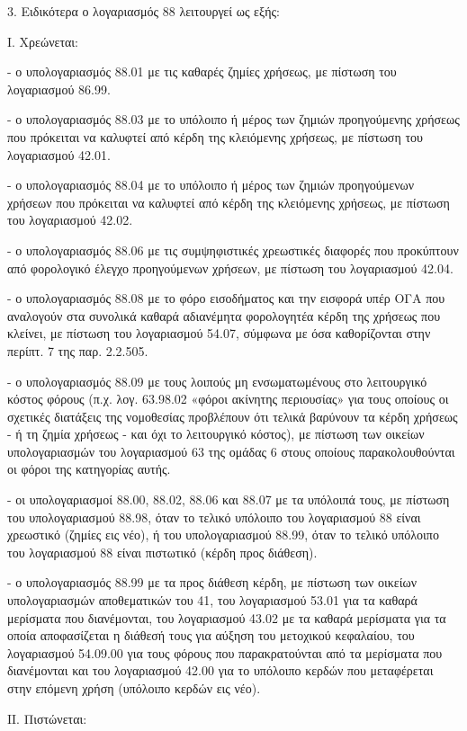 \documentclass[A4,10pt,greek]{book}
\begin{document}
3. Ειδικότερα ο λογαριασμός 88 λειτουργεί ως εξής:

Ι. Χρεώνεται:

- ο υπολογαριασμός 88.01 με τις καθαρές ζημίες χρήσεως, με πίστωση του λογαριασμού 86.99.

- ο υπολογαριασμός 88.03 με το υπόλοιπο ή μέρος των ζημιών προηγούμενης χρήσεως που πρόκειται να καλυφτεί από κέρδη της κλειόμενης χρήσεως, με πίστωση του λογαριασμού 42.01.

- ο υπολογαριασμός 88.04 με το υπόλοιπο ή μέρος των ζημιών προηγούμενων χρήσεων που πρόκειται να καλυφτεί από κέρδη της κλειόμενης χρήσεως, με πίστωση του λογαριασμού 42.02.

- ο υπολογαριασμός 88.06 με τις συμψηφιστικές χρεωστικές διαφορές που προκύπτουν από φορολογικό έλεγχο προηγούμενων χρήσεων, με πίστωση του λογαριασμού 42.04.

- ο υπολογαριασμός 88.08 με το φόρο εισοδήματος και την εισφορά υπέρ ΟΓΑ που αναλογούν στα συνολικά καθαρά αδιανέμητα φορολογητέα κέρδη της χρήσεως που κλείνει, με πίστωση του λογαριασμού 54.07, σύμφωνα με όσα καθορίζονται στην περίπτ. 7 της παρ. 2.2.505.

- ο υπολογαριασμός 88.09 με τους λοιπούς μη ενσωματωμένους στο λειτουργικό κόστος φόρους (π.χ. λογ. 63.98.02 «φόροι ακίνητης περιουσίας» για τους οποίους οι σχετικές διατάξεις της νομοθεσίας προβλέπουν ότι τελικά βαρύνουν τα κέρδη χρήσεως - ή τη ζημία χρήσεως - και όχι το λειτουργικό κόστος), με πίστωση των οικείων υπολογαριασμών του λογαριασμού 63 της ομάδας 6 στους οποίους παρακολουθούνται οι φόροι της κατηγορίας αυτής.

- οι υπολογαριασμοί 88.00, 88.02, 88.06 και 88.07 με τα υπόλοιπά τους, με πίστωση του υπολογαριασμού 88.98, όταν το τελικό υπόλοιπο του λογαριασμού 88 είναι χρεωστικό (ζημίες εις νέο), ή του υπολογαριασμού 88.99, όταν το τελικό υπόλοιπο του λογαριασμού 88 είναι πιστωτικό (κέρδη προς διάθεση).

- ο υπολογαριασμός 88.99 με τα προς διάθεση κέρδη, με πίστωση των οικείων υπολογαριασμών αποθεματικών του 41, του λογαριασμού 53.01 για τα καθαρά μερίσματα που διανέμονται, του λογαριασμού 43.02 με τα καθαρά μερίσματα για τα οποία αποφασίζεται η διάθεσή τους για αύξηση του μετοχικού κεφαλαίου, του λογαριασμού 54.09.00 για τους φόρους που παρακρατούνται από τα μερίσματα που διανέμονται και του λογαριασμού 42.00 για το υπόλοιπο κερδών που μεταφέρεται στην επόμενη χρήση (υπόλοιπο κερδών εις νέο).

ΙΙ. Πιστώνεται:
\end{document}
